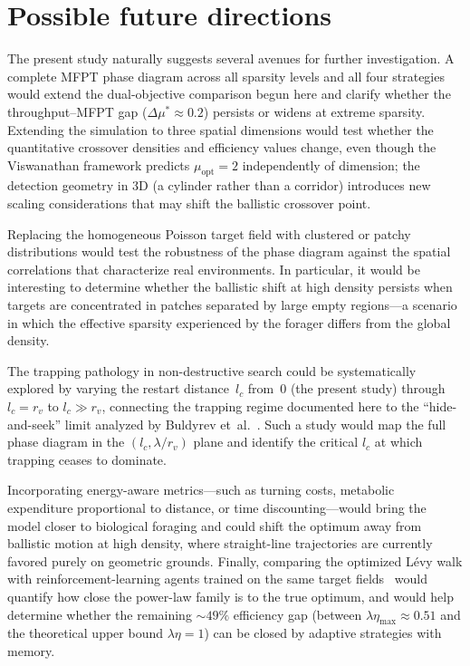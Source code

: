 \section{Possible future directions}

The present study naturally suggests several avenues for further investigation. A complete MFPT phase diagram across all sparsity levels and all four strategies would extend the dual-objective comparison begun here and clarify whether the throughput--MFPT gap ($\Delta\mu^* \approx 0.2$) persists or widens at extreme sparsity. Extending the simulation to three spatial dimensions would test whether the quantitative crossover densities and efficiency values change, even though the Viswanathan framework predicts $\mu_{\mathrm{opt}} = 2$ independently of dimension; the detection geometry in 3D (a cylinder rather than a corridor) introduces new scaling considerations that may shift the ballistic crossover point.

Replacing the homogeneous Poisson target field with clustered or patchy distributions would test the robustness of the phase diagram against the spatial correlations that characterize real environments. In particular, it would be interesting to determine whether the ballistic shift at high density persists when targets are concentrated in patches separated by large empty regions---a scenario in which the effective sparsity experienced by the forager differs from the global density.

The trapping pathology in non-destructive search could be systematically explored by varying the restart distance~$l_c$ from~$0$ (the present study) through $l_c = r_v$ to $l_c \gg r_v$, connecting the trapping regime documented here to the ``hide-and-seek'' limit analyzed by Buldyrev et~al.~\cite{buldyrev2021comment}. Such a study would map the full phase diagram in the $(l_c, \lambda/r_v)$ plane and identify the critical $l_c$ at which trapping ceases to dominate.

Incorporating energy-aware metrics---such as turning costs, metabolic expenditure proportional to distance, or time discounting---would bring the model closer to biological foraging and could shift the optimum away from ballistic motion at high density, where straight-line trajectories are currently favored purely on geometric grounds. Finally, comparing the optimized L\'evy walk with reinforcement-learning agents trained on the same target fields~\cite{munozgil2023optimal,kaur2023adaptive,caraglio2024learning} would quantify how close the power-law family is to the true optimum, and would help determine whether the remaining ${\sim}49\%$ efficiency gap (between $\lambda\eta_{\max} \approx 0.51$ and the theoretical upper bound $\lambda\eta = 1$) can be closed by adaptive strategies with memory.